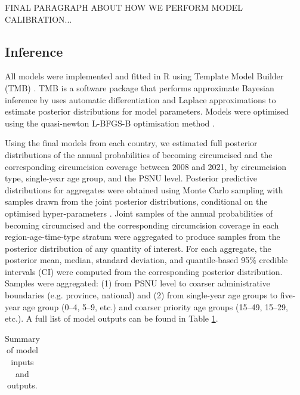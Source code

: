 \documentclass{article}
\begin{document}
\begin{appendix}
{\color{red} FINAL PARAGRAPH ABOUT HOW WE PERFORM MODEL CALIBRATION...}


\subsection{Inference}
\label{sec::inference}


All models were implemented and fitted in R \cite{rcore} using Template Model Builder (TMB) \cite{kristensen2016tmb}. TMB is a software package that performs approximate Bayesian inference by uses automatic differentiation and Laplace approximations to estimate posterior distributions for model parameters. Models were optimised using the {\color{red}quasi-newton L-BFGS-B} optimisation method \cite{byrd1995limited}.

Using the final models from each country, we estimated full posterior distributions of the annual probabilities of becoming circumcised and the corresponding circumcision coverage {\color{red}between 2008 and 2021}, by circumcision type, single-year age group, and the PSNU level. Posterior predictive distributions for aggregates were obtained using Monte Carlo sampling with samples drawn from the joint posterior distributions, conditional on the optimised hyper-parameters \cite{eaton2021naomi}. Joint samples of the annual probabilities of becoming circumcised and the corresponding circumcision coverage in each region-age-time-type stratum were aggregated to produce samples from the posterior distribution of any quantity of interest. For each aggregate, the posterior mean, median, standard deviation, and quantile-based 95\% credible intervals (CI) were computed from the corresponding posterior distribution. Samples were aggregated: (1) from PSNU level to coarser administrative boundaries (e.g. province, national) and (2) from single-year age groups to five-year age group (0--4, 5--9, etc.) and coarser priority age groups (15--49, 15--29, etc.). A full list of model outputs can be found in Table \ref{tab::inputsoutputs}.

{\linespread{1} 
\begin{table}[H]
	\small
	\centering	
	\caption{Summary of model inputs and outputs.}
    \label{tab::inputsoutputs}
	\begin{tabular}{| p{0.45\linewidth} | p{0.45\linewidth} |}
		\hline


\end{tabular}
\end{table}}
\end{appendix}
\end{document}

